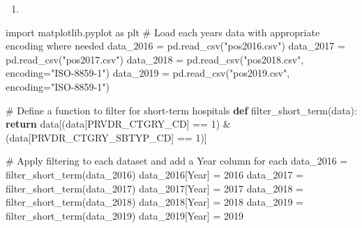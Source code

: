 \documentclass[
  letterpaper,
  DIV=11,
  numbers=noendperiod]{scrartcl}
\newenvironment{Shaded}{\begin{snugshade}}{\end{snugshade}}
\newcommand{\CommentTok}[1]{\textcolor[rgb]{0.37,0.37,0.37}{#1}}
\newcommand{\ControlFlowTok}[1]{\textcolor[rgb]{0.00,0.23,0.31}{\textbf{#1}}}
\newcommand{\DecValTok}[1]{\textcolor[rgb]{0.68,0.00,0.00}{#1}}
\newcommand{\ImportTok}[1]{\textcolor[rgb]{0.00,0.46,0.62}{#1}}
\newcommand{\KeywordTok}[1]{\textcolor[rgb]{0.00,0.23,0.31}{\textbf{#1}}}
\newcommand{\NormalTok}[1]{\textcolor[rgb]{0.00,0.23,0.31}{#1}}
\newcommand{\OperatorTok}[1]{\textcolor[rgb]{0.37,0.37,0.37}{#1}}
\newcommand{\StringTok}[1]{\textcolor[rgb]{0.13,0.47,0.30}{#1}}
\providecommand{\tightlist}{%
  \setlength{\itemsep}{0pt}\setlength{\parskip}{0pt}}\usepackage{longtable,booktabs,array}
\begin{document}
\begin{enumerate}
\def\labelenumi{\arabic{enumi}.}
\setcounter{enumi}{2}
\tightlist
\item
\end{enumerate}

\begin{Shaded}
\begin{Highlighting}[]
\ImportTok{import}\NormalTok{ matplotlib.pyplot }\ImportTok{as}\NormalTok{ plt}
\CommentTok{\# Load each year\textquotesingle{}s data with appropriate encoding where needed}
\NormalTok{data\_2016 }\OperatorTok{=}\NormalTok{ pd.read\_csv(}\StringTok{"pos2016.csv"}\NormalTok{)}
\NormalTok{data\_2017 }\OperatorTok{=}\NormalTok{ pd.read\_csv(}\StringTok{"pos2017.csv"}\NormalTok{)}
\NormalTok{data\_2018 }\OperatorTok{=}\NormalTok{ pd.read\_csv(}\StringTok{"pos2018.csv"}\NormalTok{, encoding}\OperatorTok{=}\StringTok{"ISO{-}8859{-}1"}\NormalTok{)}
\NormalTok{data\_2019 }\OperatorTok{=}\NormalTok{ pd.read\_csv(}\StringTok{"pos2019.csv"}\NormalTok{, encoding}\OperatorTok{=}\StringTok{"ISO{-}8859{-}1"}\NormalTok{)}

\CommentTok{\# Define a function to filter for short{-}term hospitals}
\KeywordTok{def}\NormalTok{ filter\_short\_term(data):}
    \ControlFlowTok{return}\NormalTok{ data[(data[}\StringTok{\textquotesingle{}PRVDR\_CTGRY\_CD\textquotesingle{}}\NormalTok{] }\OperatorTok{==} \DecValTok{1}\NormalTok{) }\OperatorTok{\&}\NormalTok{ (data[}\StringTok{\textquotesingle{}PRVDR\_CTGRY\_SBTYP\_CD\textquotesingle{}}\NormalTok{] }\OperatorTok{==} \DecValTok{1}\NormalTok{)]}

\CommentTok{\# Apply filtering to each dataset and add a \textquotesingle{}Year\textquotesingle{} column for each}
\NormalTok{data\_2016 }\OperatorTok{=}\NormalTok{ filter\_short\_term(data\_2016)}
\NormalTok{data\_2016[}\StringTok{\textquotesingle{}Year\textquotesingle{}}\NormalTok{] }\OperatorTok{=} \DecValTok{2016}
\NormalTok{data\_2017 }\OperatorTok{=}\NormalTok{ filter\_short\_term(data\_2017)}
\NormalTok{data\_2017[}\StringTok{\textquotesingle{}Year\textquotesingle{}}\NormalTok{] }\OperatorTok{=} \DecValTok{2017}
\NormalTok{data\_2018 }\OperatorTok{=}\NormalTok{ filter\_short\_term(data\_2018)}
\NormalTok{data\_2018[}\StringTok{\textquotesingle{}Year\textquotesingle{}}\NormalTok{] }\OperatorTok{=} \DecValTok{2018}
\NormalTok{data\_2019 }\OperatorTok{=}\NormalTok{ filter\_short\_term(data\_2019)}
\NormalTok{data\_2019[}\StringTok{\textquotesingle{}Year\textquotesingle{}}\NormalTok{] }\OperatorTok{=} \DecValTok{2019}


\end{Highlighting}
\end{Shaded}
\end{document}
